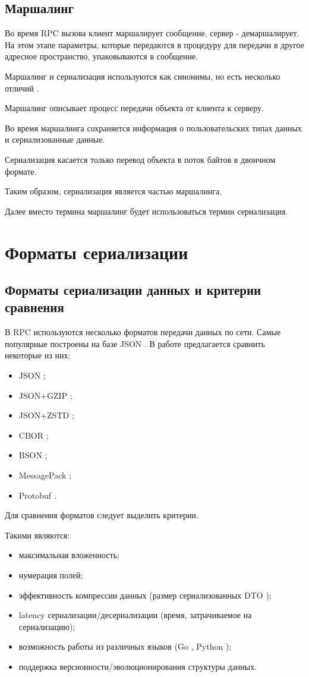 \clearpage
\section{Маршалинг}

Во время RPC вызова клиент маршалирует сообщение, сервер - демаршалирует.
На этом этапе параметры, которые передаются в процедуру для передачи в другое адресное пространство, упаковываются в сообщение.

Маршалинг и сериализация используются как синонимы, но есть несколько отличий \cite{marshal-vs-serialize}.

Маршалинг описывает процесс передачи объекта от клиента к серверу. 

Во время маршалинга сохраняется информация о пользовательских типах данных и сериализованные данные.

Сериализация касается только перевод объекта в поток байтов в двоичном формате.

Таким образом, сериализация является частью маршалинга.

Далее вместо термина маршалинг будет использоваться термин сериализация.  

\chapter{Форматы сериализации}

\section{Форматы сериализации данных и критерии сравнения}

В RPC используются несколько форматов передачи данных по сети.
Самые популярные построены на базе JSON \cite{json-info}.
В работе предлагается сравнить некоторые из них:
\begin{itemize}
\item JSON \cite{json-serialize};
\item JSON+GZIP \cite{gzip};
\item JSON+ZSTD \cite{zstd};
\item CBOR \cite{cbor};
\item BSON \cite{bson};
\item MessagePack \cite{messagepack};
\item Protobuf \cite{protobuf}.
\end{itemize}
\newpage
Для сравнения форматов следует выделить критерии.

Такими являются:
\begin{itemize}
\item максимальная вложенность;
\item нумерация полей;
\item эффективность компрессии данных (размер сериализованных DTO \cite{dto-info});
\item latency сериализации/десериализации (время, затрачиваемое на сериализацию);
\item возможность работы из различных языков (Go \cite{golang}, Python \cite{python});
\item поддержка версионности/эволюционирования структуры данных.
\end{itemize}

